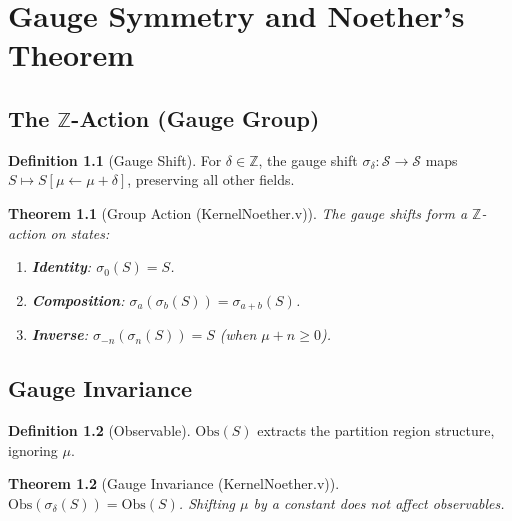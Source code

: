 \documentclass[11pt, a4paper]{report}
\theoremstyle{definition}
\newtheorem{definition}{Definition}[chapter]
\theoremstyle{plain}
\newtheorem{theorem}{Theorem}[chapter]
\newcommand{\Z}{\mathbb{Z}}
\newcommand{\Sspace}{\mathcal{S}}
\begin{document}
\chapter{Gauge Symmetry and Noether's Theorem}

\section{The $\Z$-Action (Gauge Group)}

\begin{definition}[Gauge Shift]
For $\delta \in \Z$, the gauge shift $\sigma_\delta: \Sspace \to \Sspace$ maps $S \mapsto S[\mu \gets \mu + \delta]$, preserving all other fields.
\end{definition}

\begin{theorem}[Group Action {\normalfont (KernelNoether.v)}]
The gauge shifts form a $\Z$-action on states:
\begin{enumerate}
    \item \textbf{Identity}: $\sigma_0(S) = S$.
    \item \textbf{Composition}: $\sigma_a(\sigma_b(S)) = \sigma_{a+b}(S)$.
    \item \textbf{Inverse}: $\sigma_{-n}(\sigma_n(S)) = S$ (when $\mu + n \ge 0$).
\end{enumerate}
\end{theorem}

\section{Gauge Invariance}

\begin{definition}[Observable]
$\mathrm{Obs}(S)$ extracts the partition region structure, ignoring $\mu$.
\end{definition}

\begin{theorem}[Gauge Invariance {\normalfont (KernelNoether.v)}]
$\mathrm{Obs}(\sigma_\delta(S)) = \mathrm{Obs}(S)$. Shifting $\mu$ by a constant does not affect observables.
\end{theorem}
\end{document}
